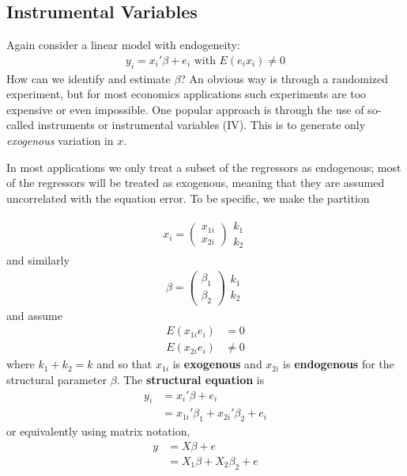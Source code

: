 \documentclass[11pt]{article} %
\theoremstyle{definition}
\numberwithin{defn}{subsection}
\numberwithin{thm}{subsection}
\numberwithin{ex}{subsection}
\begin{document}
\subsection{Instrumental Variables}
Again consider a linear model with endogeneity:
\begin{align*}
y_i=x_i'\beta+e_i\text{ with }E(e_ix_i)\neq 0
\end{align*}
How can we identify and estimate $\beta$? An obvious way is through a randomized experiment, but for most economics applications such experiments are too expensive or even impossible. One popular approach is through the use of so-called instruments or instrumental variables (IV). This is to generate only \textit{exogenous} variation in $x$. 

In most applications we only treat a subset of the regressors as endogenous; most of the regressors will be treated as exogenous, meaning that they are assumed uncorrelated with the equation error. To be specific, we make the partition

\begin{align*}
x_i=\begin{pmatrix}x_{1i}\\x_{2i}\end{pmatrix}\begin{matrix}k_1\\k_2\end{matrix}
\end{align*}
and similarly
\begin{align*}
\beta=\begin{pmatrix}\beta_{1}\\\beta_{2}\end{pmatrix}\begin{matrix}k_1\\k_2\end{matrix}
\end{align*}
and assume 
\begin{align*}
E(x_{1i}e_i)&=0\\
E(x_{2i}e_i)&\neq0
\end{align*}
where $k_1+k_2=k$ and so that $x_{1i}$ is \textbf{exogenous} and $x_{2i}$ is \textbf{endogenous} for the structural parameter $\beta$. The \textbf{structural equation} is
\begin{align*}
y_i&=x_i'\beta+e_i\\
   &=x_{1i}'\beta_1+x_{2i}'\beta_2+e_i
\end{align*}
or equivalently using matrix notation,
\begin{align*}
y&=X\beta+e\\
 &=X_1\beta+X_2\beta_2+e
\end{align*}
\end{document}
